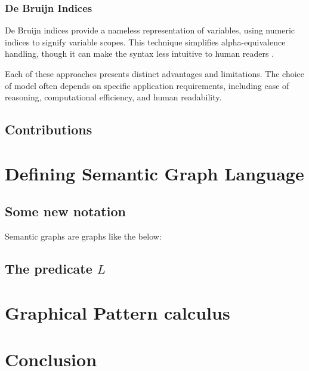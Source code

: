 \documentclass[a4paper,UKenglish,cleveref,autoref,thm-restate]{lipics-v2021}
\begin{document}
\subsubsection{De Bruijn Indices}
De Bruijn indices provide a nameless representation of variables, using numeric
indices to signify variable scopes. This technique simplifies alpha-equivalence
handling, though it can make the syntax less intuitive to human readers
\cite{bruijn72lambda}.

Each of these approaches presents distinct advantages and limitations. The
choice of model often depends on specific application requirements, including
ease of reasoning, computational efficiency, and human readability.

\subsection{Contributions}


\section{Defining Semantic Graph Language}

\subsection{Some new notation}

Semantic graphs are graphs like the below:


\subsection{The predicate $L$}

\section{Graphical Pattern calculus}

\section{Conclusion}

%
%
{}

\end{document}

